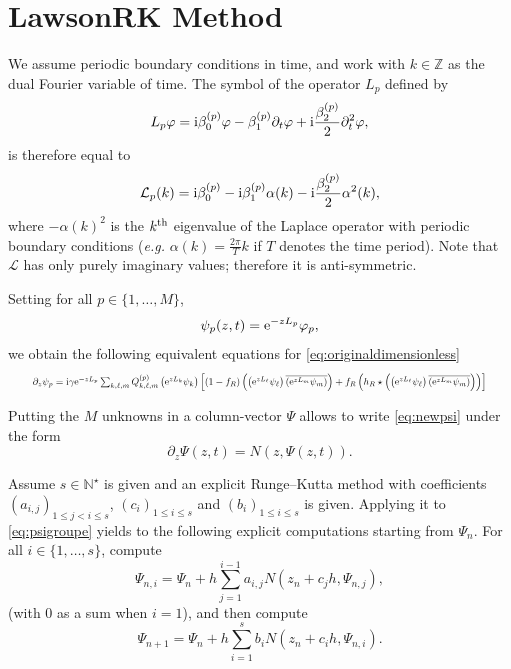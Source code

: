 \documentclass[11pt]{amsart}
\newcommand{\Z}{{\mathbb Z}}
\newcommand{\N}{{\mathbb N}}
\newcommand{\ii}{{\rm i}}
\begin{document}
\section{LawsonRK Method}
\label{sec:method}

We assume periodic boundary conditions in time, and work with $k\in\Z$ as the dual Fourier variable
of time. The symbol of the operator $L_p$ defined by
\begin{equation}
  \label{eq:defLp}
  L_p \varphi =
   \ii\beta_0^{(p)} \varphi
  -\beta_1^{(p)} \partial_t \varphi
  +\ii\frac{\beta_2^{(p)}}{2} \partial_t^2\varphi,
\end{equation}
is therefore equal to
\begin{equation}
  \label{eq:symboleLp}
  \mathcal L_p(k) = \ii\beta_0^{(p)}-\ii\beta^{(p)}_1 \alpha(k)-\ii\frac{\beta_2^{(p)}}{2}\alpha^2(k),
\end{equation}
where $-\alpha(k)^2$ is the $k^{\rm th}$ eigenvalue of the Laplace operator with periodic boundary
conditions ({\it e.g.} $\alpha(k)=\frac{2\pi}{T}k$ if $T$ denotes the time period).
Note that $\mathcal L$ has only purely imaginary values; therefore it is anti-symmetric.

Setting for all $p\in\{1,\dots,M\}$,
\begin{equation}
  \label{eq:chgtvar}
  \psi_p(z,t) = {\rm e}^{-zL_p} \varphi_p,
\end{equation}
we obtain the following equivalent equations for \eqref{eq:originaldimensionless}
\begin{equation}
  \label{eq:newpsi}
  \resizebox{0.94\hsize}{!}{$
  \partial_z \psi_p = \ii\gamma {\rm e}^{-z L_p} \sum_{k,\ell,m} Q^{(p)}_{k,\ell,m}
  \left( {\rm e}^{z L_k}\psi_k \right) \left[
    (1-f_R) \left(
      \left( {\rm e}^{z L_\ell} \psi_\ell \right)
      \overline{ \left( {\rm e}^{z L_m} \psi_m \right) } \right)
    + f_R \left(
      h_R \star \left(
        \left( {\rm e}^{z L_\ell} \psi_\ell \right)
        \overline{ \left( {\rm e}^{z L_m} \psi_m \right) } \right)
    \right)
  \right] $}
\end{equation}

Putting the $M$ unknowns in a column-vector $\Psi$ allows to write \eqref{eq:newpsi} under the form
\begin{equation}
  \label{eq:psigroupe}
  \partial_z \Psi(z,t) = N(z,\Psi(z,t)).
\end{equation}

Assume $s\in\N^\star$ is given and an explicit Runge--Kutta method with coefficients
$(a_{i,j})_{1\leq j<i\leq s}$, $(c_{i})_{1\leq i\leq s}$ and $(b_i)_{1\leq i\leq s}$ is given.
Applying it to \eqref{eq:psigroupe} yields to the following explicit computations starting
from $\Psi_n$.
For all $i\in\{1,\dots,s\}$, compute
\begin{equation}
  \label{eq:RKintern}
  \Psi_{n,i}=\Psi_n+h\sum_{j=1}^{i-1} a_{i,j} N(z_n+c_j h,\Psi_{n,j}),
\end{equation}
(with $0$ as a sum when $i=1$), and then compute
\begin{equation}
  \label{eq:RKexplicit}
  \Psi_{n+1} = \Psi_n + h\sum_{i=1}^s b_i N(z_n+c_i h, \Psi_{n,i}).
\end{equation}
\end{document}

